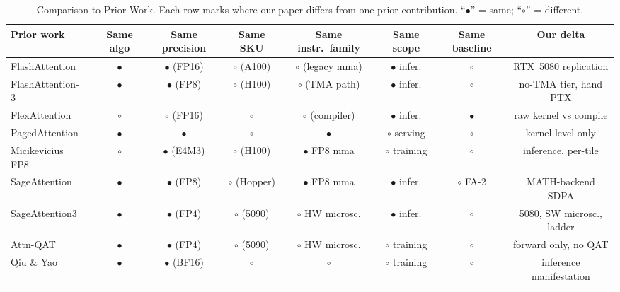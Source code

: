 \documentclass[conference]{IEEEtran}
\begin{document}
\begin{table}[t]
  \centering
  \caption{Comparison to Prior Work. Each row marks where our paper
    differs from one prior contribution. ``$\bullet$'' = same;
    ``$\circ$'' = different.}
  \label{tab:prior_work}
  \footnotesize
  \begin{tabular}{lccccccc}
    \toprule
    \textbf{Prior work} & \textbf{Same algo} & \textbf{Same precision} &
    \textbf{Same SKU} & \textbf{Same instr.\ family} &
    \textbf{Same scope} & \textbf{Same baseline} & \textbf{Our delta} \\
    \midrule
    FlashAttention~\cite{dao2022flashattention}        & $\bullet$ & $\bullet$ (FP16) & $\circ$ (A100) & $\circ$ (legacy mma) & $\bullet$ infer. & $\circ$ & RTX~5080 replication \\
    FlashAttention-3~\cite{shah2024flashattention3}    & $\bullet$ & $\bullet$ (FP8) & $\circ$ (H100)  & $\circ$ (TMA path)   & $\bullet$ infer. & $\circ$ & no-TMA tier, hand PTX \\
    FlexAttention~\cite{dong2025flexattention}         & $\circ$   & $\circ$ (FP16)   & $\circ$         & $\circ$ (compiler)   & $\bullet$ infer. & $\bullet$ & raw kernel vs compile \\
    PagedAttention~\cite{kwon2023vllm}                 & $\bullet$ & $\bullet$       & $\circ$         & $\bullet$            & $\circ$ serving  & $\circ$ & kernel level only \\
    Micikevicius FP8~\cite{micikevicius2022fp8}        & $\circ$   & $\bullet$ (E4M3) & $\circ$ (H100) & $\bullet$ FP8 mma    & $\circ$ training & $\circ$ & inference, per-tile \\
    SageAttention~\cite{zhang2025sageattention}        & $\bullet$ & $\bullet$ (FP8)  & $\circ$ (Hopper) & $\bullet$ FP8 mma  & $\bullet$ infer. & $\circ$ FA-2 & MATH-backend SDPA \\
    SageAttention3~\cite{zhang2025sageattention3}      & $\bullet$ & $\bullet$ (FP4)  & $\circ$ (5090)   & $\circ$ HW microsc. & $\bullet$ infer. & $\circ$ & 5080, SW microsc., ladder \\
    Attn-QAT~\cite{zhang2026attnqat}                   & $\bullet$ & $\bullet$ (FP4)  & $\circ$ (5090)   & $\circ$ HW microsc. & $\circ$ training & $\circ$ & forward only, no QAT \\
    Qiu \& Yao~\cite{qiu2025lowprecisionfails}         & $\bullet$ & $\bullet$ (BF16) & $\circ$         & $\circ$              & $\circ$ training & $\circ$ & inference manifestation \\

\end{tabular}
\end{table}
\end{document}
